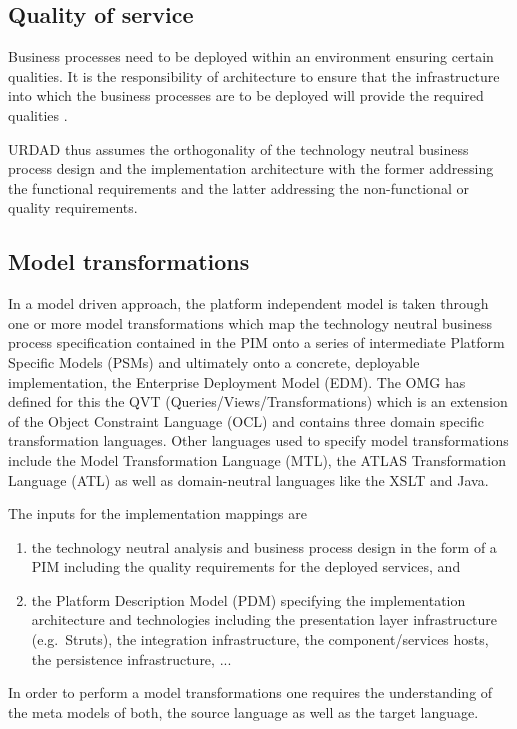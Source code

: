\documentclass[reviewcopy]{elsart}
\begin{document}
\subsection{Quality of service}

Business processes need to be deployed within an environment ensuring certain qualities.
It is the responsibility of architecture to ensure that the infrastructure into which
the business processes are to be deployed will provide the required qualities
\cite{bass:softwareArchitecture}.

URDAD thus assumes the orthogonality of the technology neutral business process design and
the implementation architecture with the former addressing the functional requirements and
the latter addressing the non-functional or quality requirements.

\subsection{Model transformations}

In a model driven approach, the platform independent model is taken through one or
more model transformations which map the technology neutral business process specification
contained in the PIM onto a series of intermediate Platform Specific Models (PSMs)
and ultimately onto a concrete, deployable implementation, the Enterprise Deployment Model (EDM).
The OMG has defined for this the QVT (Queries/Views/Transformations) \cite{omg:qvt}
which is an extension of the Object Constraint Language (OCL) and contains three domain
specific transformation languages. Other languages used to specify model transformations include
the Model Transformation Language (MTL), the ATLAS Transformation Language (ATL) as well as domain-neutral
languages like the XSLT and Java.

The inputs for the implementation mappings are
\begin{enumerate}
  \item the technology neutral analysis and business process design in the form of a PIM including
			the quality requirements for the deployed services, and
  \item the Platform Description Model (PDM) specifying the implementation architecture
			and technologies including the presentation layer infrastructure (e.g.\ Struts),
			the integration infrastructure, the component/services hosts, the persistence
			infrastructure, ...
\end{enumerate}
In order to perform a model transformations one requires the understanding of the meta models of both,
the source language as well as the target language.
\end{document}
